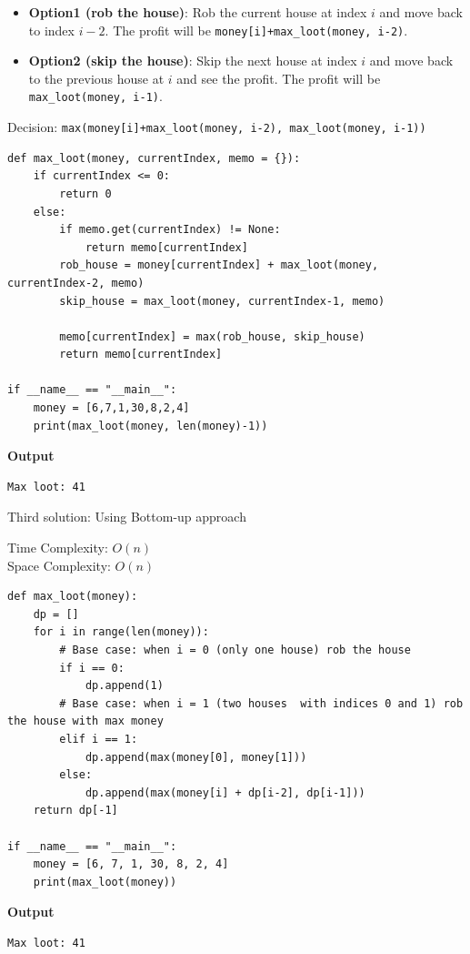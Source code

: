 \documentclass[a4paper,11pt]{book}
\begin{document}
\begin{itemize}
\item \textbf{Option1 (rob the house)}: Rob the current house at index $i$ and move back to index $i-2$. The profit will be \lstinline{money[i]+max_loot(money, i-2)}. 
\item \textbf{Option2 (skip the house)}: Skip the next house at index $i$ and move back to the previous house at $i$ and see the profit. The profit will be \lstinline{max_loot(money, i-1)}.
\end{itemize}

\noindent Decision: \lstinline{max(money[i]+max_loot(money, i-2), max_loot(money, i-1))}

\begin{lstlisting}
def max_loot(money, currentIndex, memo = {}):
    if currentIndex <= 0:
        return 0
    else:
        if memo.get(currentIndex) != None:
            return memo[currentIndex]
        rob_house = money[currentIndex] + max_loot(money, currentIndex-2, memo)
        skip_house = max_loot(money, currentIndex-1, memo)

        memo[currentIndex] = max(rob_house, skip_house)
        return memo[currentIndex]
        
if __name__ == "__main__":
    money = [6,7,1,30,8,2,4]
    print(max_loot(money, len(money)-1))
\end{lstlisting}
\textbf{Output}
\begin{lstlisting}
Max loot: 41
\end{lstlisting}

\noindent Third solution: Using Bottom-up approach

\noindent Time Complexity: $O(n)$\\
\noindent Space Complexity: $O(n)$

\begin{lstlisting}
def max_loot(money):
    dp = []
    for i in range(len(money)):
        # Base case: when i = 0 (only one house) rob the house
        if i == 0:
            dp.append(1)
        # Base case: when i = 1 (two houses  with indices 0 and 1) rob the house with max money
        elif i == 1:
            dp.append(max(money[0], money[1]))
        else:
            dp.append(max(money[i] + dp[i-2], dp[i-1]))
    return dp[-1]  
 
if __name__ == "__main__":
    money = [6, 7, 1, 30, 8, 2, 4]
    print(max_loot(money))
\end{lstlisting}
\textbf{Output}
\begin{lstlisting}
Max loot: 41
\end{lstlisting}
\end{document}

